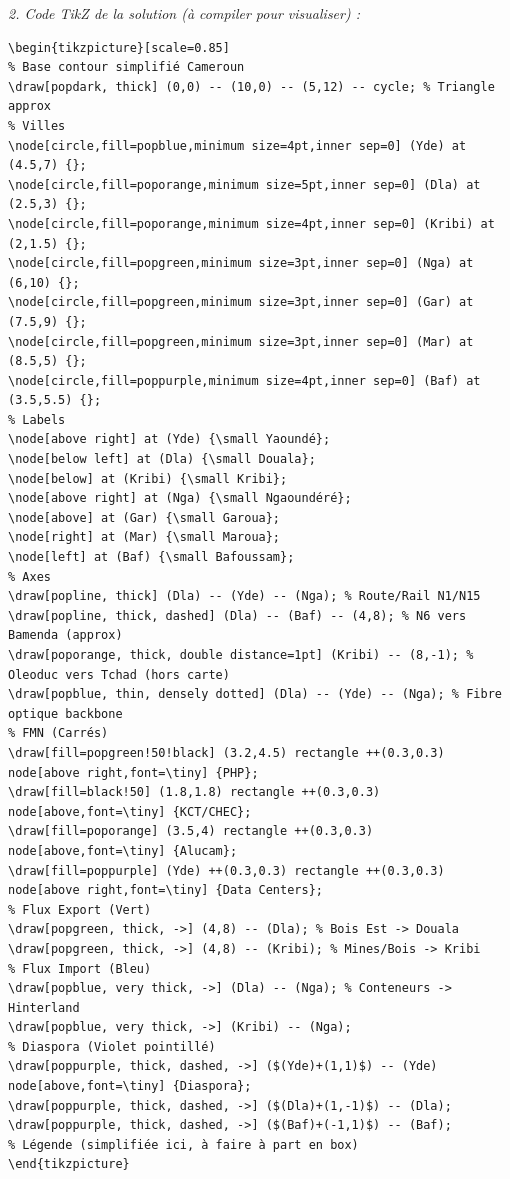 \documentclass[11pt]{article}
\begin{document}
\begin{exoresolu}
\textit{2. Code TikZ de la solution (à compiler pour visualiser) :}
\begin{verbatim}
\begin{tikzpicture}[scale=0.85]
% Base contour simplifié Cameroun
\draw[popdark, thick] (0,0) -- (10,0) -- (5,12) -- cycle; % Triangle approx
% Villes
\node[circle,fill=popblue,minimum size=4pt,inner sep=0] (Yde) at (4.5,7) {};
\node[circle,fill=poporange,minimum size=5pt,inner sep=0] (Dla) at (2.5,3) {};
\node[circle,fill=poporange,minimum size=4pt,inner sep=0] (Kribi) at (2,1.5) {};
\node[circle,fill=popgreen,minimum size=3pt,inner sep=0] (Nga) at (6,10) {};
\node[circle,fill=popgreen,minimum size=3pt,inner sep=0] (Gar) at (7.5,9) {};
\node[circle,fill=popgreen,minimum size=3pt,inner sep=0] (Mar) at (8.5,5) {};
\node[circle,fill=poppurple,minimum size=4pt,inner sep=0] (Baf) at (3.5,5.5) {};
% Labels
\node[above right] at (Yde) {\small Yaoundé};
\node[below left] at (Dla) {\small Douala};
\node[below] at (Kribi) {\small Kribi};
\node[above right] at (Nga) {\small Ngaoundéré};
\node[above] at (Gar) {\small Garoua};
\node[right] at (Mar) {\small Maroua};
\node[left] at (Baf) {\small Bafoussam};
% Axes
\draw[popline, thick] (Dla) -- (Yde) -- (Nga); % Route/Rail N1/N15
\draw[popline, thick, dashed] (Dla) -- (Baf) -- (4,8); % N6 vers Bamenda (approx)
\draw[poporange, thick, double distance=1pt] (Kribi) -- (8,-1); % Oleoduc vers Tchad (hors carte)
\draw[popblue, thin, densely dotted] (Dla) -- (Yde) -- (Nga); % Fibre optique backbone
% FMN (Carrés)
\draw[fill=popgreen!50!black] (3.2,4.5) rectangle ++(0.3,0.3) node[above right,font=\tiny] {PHP};
\draw[fill=black!50] (1.8,1.8) rectangle ++(0.3,0.3) node[above,font=\tiny] {KCT/CHEC};
\draw[fill=poporange] (3.5,4) rectangle ++(0.3,0.3) node[above,font=\tiny] {Alucam};
\draw[fill=poppurple] (Yde) ++(0.3,0.3) rectangle ++(0.3,0.3) node[above right,font=\tiny] {Data Centers};
% Flux Export (Vert)
\draw[popgreen, thick, ->] (4,8) -- (Dla); % Bois Est -> Douala
\draw[popgreen, thick, ->] (4,8) -- (Kribi); % Mines/Bois -> Kribi
% Flux Import (Bleu)
\draw[popblue, very thick, ->] (Dla) -- (Nga); % Conteneurs -> Hinterland
\draw[popblue, very thick, ->] (Kribi) -- (Nga);
% Diaspora (Violet pointillé)
\draw[poppurple, thick, dashed, ->] ($(Yde)+(1,1)$) -- (Yde) node[above,font=\tiny] {Diaspora};
\draw[poppurple, thick, dashed, ->] ($(Dla)+(1,-1)$) -- (Dla);
\draw[poppurple, thick, dashed, ->] ($(Baf)+(-1,1)$) -- (Baf);
% Légende (simplifiée ici, à faire à part en box)
\end{tikzpicture}
\end{verbatim}


\end{exoresolu}
\end{document}
